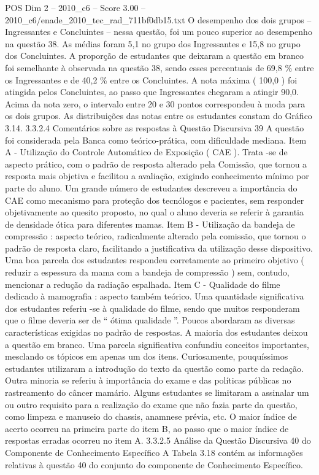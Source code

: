 \begin{textsample}{POS Dim 2 – 2010\_c6 – Score 3.00 – 2010\_c6/enade\_2010\_tec\_rad\_711bf0db15.txt}
O desempenho dos dois grupos – Ingressantes e Concluintes – nessa questão, foi um pouco superior ao desempenho na questão 38.
As médias foram 5,1 no grupo dos Ingressantes e 15,8 no grupo dos Concluintes.
A proporção de estudantes que deixaram a questão em branco foi semelhante à observada na questão 38, sendo esses percentuais de 69,8 \% entre os Ingressantes e de 40,2 \% entre os Concluintes.
A nota máxima ( 100,0 ) foi atingida pelos Concluintes, ao passo que Ingressantes chegaram a atingir 90,0.
Acima da nota zero, o intervalo entre 20 e 30 pontos correspondeu à moda para os dois grupos.
As distribuições das notas entre os estudantes constam do Gráfico 3.14. 3.3.2.4 Comentários sobre as respostas à Questão Discursiva 39 A questão foi considerada pela Banca como teórico-prática, com dificuldade mediana.
Item A - Utilização do Controle Automático de Exposição ( CAE ).
Trata -se de aspecto prático, com o padrão de resposta alterado pela Comissão, que tornou a resposta mais objetiva e facilitou a avaliação, exigindo conhecimento mínimo por parte do aluno.
Um grande número de estudantes descreveu a importância do CAE como mecanismo para proteção dos tecnólogos e pacientes, sem responder objetivamente ao quesito proposto, no qual o aluno deveria se referir à garantia de densidade ótica para diferentes mamas.
Item B - Utilização da bandeja de compressão : aspecto teórico, radicalmente alterado pela comissão, que tornou o padrão de resposta claro, facilitando a justificativa da utilização desse dispositivo.
Uma boa parcela dos estudantes respondeu corretamente ao primeiro objetivo ( reduzir a espessura da mama com a bandeja de compressão ) sem, contudo, mencionar a redução da radiação espalhada.
Item C - Qualidade do filme dedicado à mamografia : aspecto também teórico.
Uma quantidade significativa dos estudantes referiu -se à qualidade do filme, sendo que muitos responderam que o filme deveria ser de “ ótima qualidade ”.
Poucos abordaram as diversas características exigidas no padrão de respostas.
A maioria dos estudantes deixou a questão em branco.
Uma parcela significativa confundiu conceitos importantes, mesclando os tópicos em apenas um dos itens.
Curiosamente, pouquíssimos estudantes utilizaram a introdução do texto da questão como parte da redação.
Outra minoria se referiu à importância do exame e das políticas públicas no rastreamento do câncer mamário.
Alguns estudantes se limitaram a assinalar um ou outro requisito para a realização do exame que não fazia parte da questão, como limpeza e manuseio do chassis, anamnese prévia, etc.
O maior índice de acerto ocorreu na primeira parte do item B, ao passo que o maior índice de respostas erradas ocorreu no item A. 3.3.2.5 Análise da Questão Discursiva 40 do Componente de Conhecimento Específico A Tabela 3.18 contém as informações relativas à questão 40 do conjunto do componente de Conhecimento Específico.

\end{textsample}
